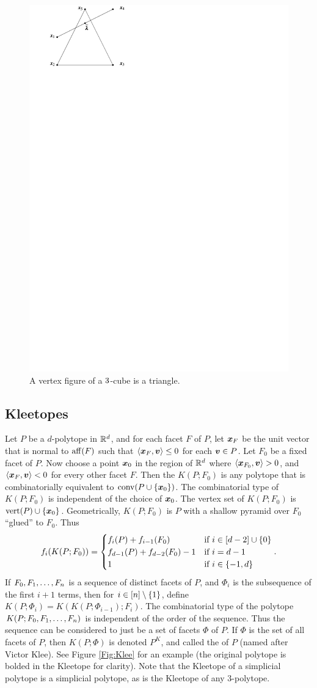         \begin{center}
            \begin{figure}[h!bt]
                \includegraphics[page=19, width=.3\textwidth]{pictures.pdf}
                \caption{A vertex figure of a \protect$3\protect$-cube is a triangle.}
            \end{figure}
        \end{center}
    \subsection{Kleetopes}\label{Subsec:Kleetopes}
        Let \(P\) be a \(d\)-polytope in \(\mathbb{R}^{d}\), and for each facet \(F\) of \(P\), let \(\bm{x}_F\) be the unit vector that is normal to \(\operatorname{aff}(F)\) such that \(\left\langle\bm{x}_F,\bm{v}\right\rangle\le0\) for each \(\bm{v}\in P\).  Let \(F_0\) be a fixed facet of \(P\). Now choose a point \(\bm{x}_0\) in the region of \(\mathbb{R}^{d}\) where \(\left\langle\bm{x}_{F_0},\bm{v}\right\rangle>0\), and \(\left\langle\bm{x}_F,\bm{v}\right\rangle<0\) for every other facet \(F\).  Then the  \(K(P;F_0)\) is any polytope that is combinatorially equivalent to \(\operatorname{conv}(P\cup\left\{\bm{x}_0\right\})\).  The combinatorial type of \(K(P;F_0)\) is independent of the choice of \(\bm{x}_0\).  The vertex set of \(K(P;F_0)\) is \(\operatorname{vert} (P)\cup\left\{\bm{x}_0\right\}\).  Geometrically, \(K(P;F_0)\) is \(P\) with a shallow pyramid over \(F_0\) ``glued'' to \(F_0\). Thus
            \[
                f_i(K(P;F_0))
                    =   \begin{cases}
                            f_i(P)+f_{i-1}(F_0)         &\text{if } i\in\left[d-2\right]\cup\left\{0\right\}\\
                            f_{d-1}(P)+f_{d-2}(F_0)-1   &\text{if } i=d-1\\
                            1                           &\text{if } i\in\left\{-1,d\right\}
                        \end{cases}.
            \]
        If \(F_0,F_1,\dotsc, F_n\) is a sequence of distinct facets of \(P\), and \(\Phi_i\) is the subsequence of the first \mbox{\(i+1\)} terms, then for \(i\in\left[n\right]\setminus\left\{1\right\}\), define \(K(P;\Phi_i)=K(K(P;\Phi_{i-1});F_i)\).  The combinatorial type of the polytope \(K(P;F_0,F_1,\dotsc, F_n)\) is independent of the order of the sequence.  Thus the sequence can be considered to just be a set of facets \(\Phi\) of \(P\).  If \(\Phi\) is the set of all facets of \(P\), then \(K(P;\Phi)\) is denoted \(P^K\), and called the  of \(P\) (named after Victor Klee).  See Figure \ref{Fig:Klee} for an example (the original polytope is bolded in the Kleetope for clarity). Note that the Kleetope of a simplicial polytope is a simplicial polytope, as is the Kleetope of any \(3\)-polytope.

